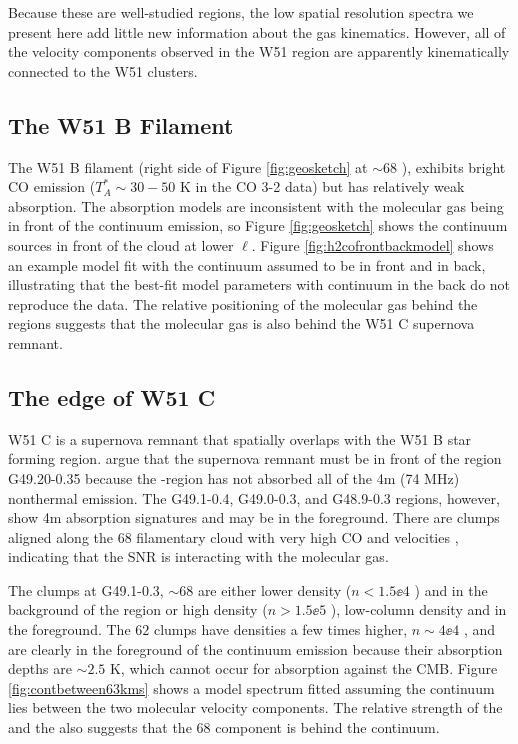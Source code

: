 Because these are well-studied regions, the low spatial resolution
\formaldehyde spectra we present here add little new information about the gas
kinematics.  However, all of the velocity components observed in the W51 region
are apparently kinematically connected to the W51 clusters.

\subsection{The W51 B Filament}
\label{sec:w51b}
The W51 B filament (right side of Figure \ref{fig:geosketch} at $\sim68$ \kms),
exhibits bright CO emission ($T_A^*\sim30-50$ K in the \citet{Parsons2012a} CO
3-2 data) but has relatively weak \formaldehyde absorption.
The absorption models are inconsistent with the molecular gas being in front of
the continuum emission, so Figure \ref{fig:geosketch} shows the continuum sources
in front of the cloud at lower $\ell$.  Figure \ref{fig:h2cofrontbackmodel}
shows an example model fit with the continuum assumed to be in front and in
back, illustrating that the best-fit model parameters with continuum in the
back do not reproduce the data.
The relative positioning of the molecular gas behind the \hii regions suggests
that the molecular gas is also behind the W51 C supernova remnant.

\subsection{The edge of W51 C}
W51 C is a supernova remnant that spatially overlaps with the W51 B star
forming region.  \citet{Brogan2013a} argue that the supernova remnant must be
in front of the \hii region G49.20-0.35 because the \hii-region has not absorbed
all of the 4m (74 MHz) nonthermal emission.  The G49.1-0.4, G49.0-0.3, and G48.9-0.3
regions, however, show 4m absorption signatures and may be in the foreground.
There are clumps aligned along the 68 \kms filamentary cloud with very high CO
and \hi velocities \citep{Koo1997b,Koo1997c,Brogan2013a}, indicating that the
SNR is interacting with the molecular gas.

The clumps at G49.1-0.3, $\sim68$ \kms are either lower density ($n<1.5\ee{4}$
\percc) and in the background of the \hii region or high density ($n>1.5\ee{5}$
\percc), low-column density and in the foreground.  The $62$ \kms clumps have
densities a few times higher, $n\sim4\ee{4}$ \percc, and are clearly in the
foreground of the continuum emission because their absorption depths are
$\sim2.5$ K, which cannot occur for absorption against the CMB.  Figure
\ref{fig:contbetween63kms} shows a model spectrum fitted assuming the continuum
lies between the two molecular velocity components.  The relative strength of
the \thirteenco and the \formaldehyde also suggests that the 68 \kms component
is behind the continuum.

